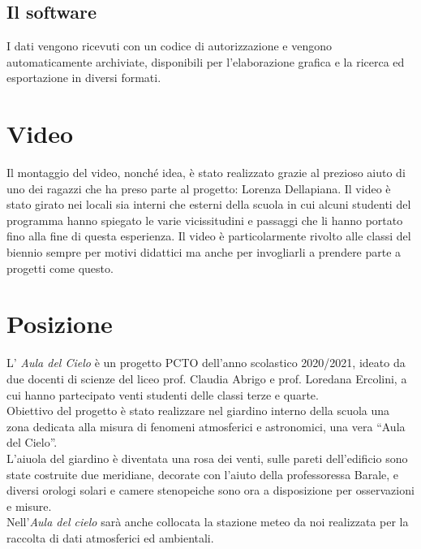 \documentclass{article}
\begin{document}
\subsection{Il software}
I dati vengono ricevuti con un codice di autorizzazione e vengono automaticamente archiviate, disponibili per l'elaborazione grafica e la ricerca ed esportazione in diversi formati.
\section{Video}

Il montaggio del video, nonché idea,  è stato realizzato grazie al prezioso aiuto di uno dei ragazzi che ha preso parte al progetto: Lorenza Dellapiana.
Il video è stato girato nei locali sia interni che esterni della scuola in cui alcuni studenti del programma hanno spiegato le varie vicissitudini e passaggi che li hanno portato fino alla fine di questa esperienza. Il video è particolarmente rivolto alle classi del biennio sempre per motivi didattici ma anche per invogliarli a prendere parte a progetti come questo.
\section{Posizione}
L' \emph{Aula del Cielo} è un progetto PCTO dell’anno scolastico 2020/2021, ideato da due docenti di scienze del liceo prof. Claudia Abrigo e prof. Loredana Ercolini, a cui hanno partecipato venti studenti delle classi terze e quarte.\\
Obiettivo del progetto è stato realizzare  nel giardino interno della scuola una zona dedicata alla misura di fenomeni atmosferici e astronomici, una vera “Aula del Cielo”. \\
L’aiuola del giardino è diventata una rosa dei venti, sulle pareti dell’edificio sono state costruite due meridiane, decorate con l’aiuto della professoressa Barale, e diversi orologi solari e camere stenopeiche sono ora a disposizione per osservazioni e misure.\\
Nell’\emph{Aula del cielo} sarà anche collocata la stazione meteo da noi realizzata per la raccolta di dati atmosferici ed ambientali.
\end{document}
